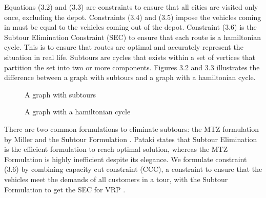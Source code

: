 Equations (3.2) and (3.3) are constraints to ensure that all cities are visited only once, excluding the depot. Constraints (3.4) and (3.5)
impose the vehicles coming in must be equal to the vehicles coming out of the depot. Constraint (3.6) is the Subtour
Elimination Constraint (SEC) to ensure that each route is a hamiltonian cycle. This is to ensure that routes are optimal
 and accurately represent the situation in real life. Subtours are
cycles that exists within a set of vertices that partition the set into two or more components. Figures
3.2 and 3.3 illustrates the difference between a graph with subtours and a graph with a hamiltonian cycle.
\vspace{0.5cm}
\begin{figure}[!ht]
  \centering

      \caption{A graph with subtours}
      \label{fig:subtour}
\end{figure}

\begin{figure}[!ht]
  \centering
{}
      \caption{A graph with a hamiltonian cycle}
      \label{fig:hamiltoniancycle}
\end{figure}


There are two common formulations to eliminate subtours: the MTZ formulation by Miller \cite{Miller1960} and
the Subtour Formulation \cite{Lawler1985, Pataki2003}. Pataki \cite{Pataki2000} states that Subtour Elimination is the efficient formulation to reach optimal solution, whereas
the MTZ Formulation is highly inefficient despite its elegance. We formulate constraint (3.6) by combining capacity cut constraint (CCC), a constraint to ensure
that the vehicles meet the demands of all customers in a tour, with the Subtour Formulation to get the SEC for VRP \cite{Daneshzand2011}.

